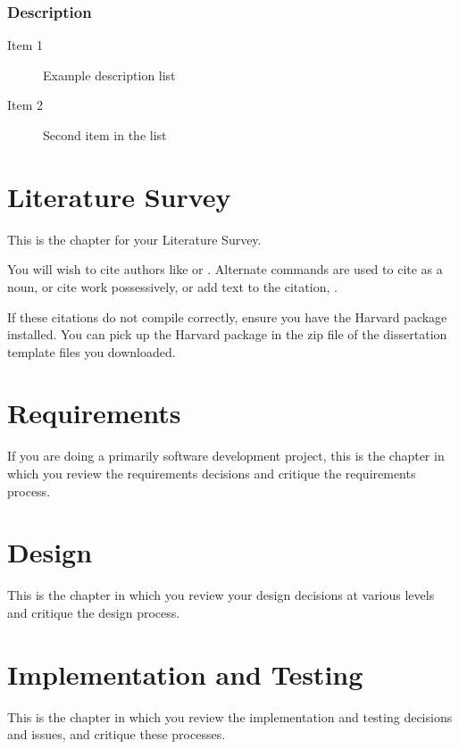 \documentclass[11pt,openright,a4paper]{report}
\begin{document}
\subsection{Description}

\begin{description}
\item[Item 1] Example description list
\item[Item 2] Second item in the list
\end{description}


\chapter{Literature Survey}
%
This is the chapter for your Literature Survey.

You will wish to cite authors like \cite{latex} or \cite{btxdoc}.  Alternate
commands are used to cite  as a noun, or cite
 work possessively, or add text to the citation, 
.

If these citations do not compile correctly, ensure you have the Harvard
package installed.  You can pick up the Harvard package in the zip file
of the dissertation template files you downloaded.



\chapter{Requirements}
If you are doing a primarily software development project, this is the
chapter in which you review the requirements decisions and
critique the requirements process.


\chapter{Design}
This is the chapter in which you review your design decisions at various
levels and critique the design process.


\chapter{Implementation and Testing}
This is the chapter in which you review the implementation and testing
decisions and issues, and critique these processes.
\end{document}
